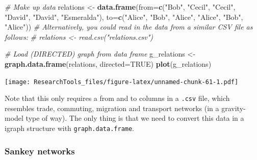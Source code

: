 \documentclass[]{article}
\newenvironment{Shaded}{\begin{snugshade}}{\end{snugshade}}
\newcommand{\KeywordTok}[1]{\textcolor[rgb]{0.13,0.29,0.53}{\textbf{{#1}}}}
\newcommand{\DataTypeTok}[1]{\textcolor[rgb]{0.13,0.29,0.53}{{#1}}}
\newcommand{\StringTok}[1]{\textcolor[rgb]{0.31,0.60,0.02}{{#1}}}
\newcommand{\CommentTok}[1]{\textcolor[rgb]{0.56,0.35,0.01}{\textit{{#1}}}}
\newcommand{\OtherTok}[1]{\textcolor[rgb]{0.56,0.35,0.01}{{#1}}}
\newcommand{\NormalTok}[1]{{#1}}
\theoremstyle{definition}
\theoremstyle{definition}
\theoremstyle{definition}
\theoremstyle{remark}
\begin{document}
\begin{Shaded}
\begin{Highlighting}[]
\CommentTok{# Make up data}
\NormalTok{relations <-}\StringTok{ }\KeywordTok{data.frame}\NormalTok{(}\DataTypeTok{from=}\KeywordTok{c}\NormalTok{(}\StringTok{"Bob"}\NormalTok{, }\StringTok{"Cecil"}\NormalTok{, }\StringTok{"Cecil"}\NormalTok{, }\StringTok{"David"}\NormalTok{, }\StringTok{"David"}\NormalTok{, }\StringTok{"Esmeralda"}\NormalTok{),}
                        \DataTypeTok{to=}\KeywordTok{c}\NormalTok{(}\StringTok{"Alice"}\NormalTok{, }\StringTok{"Bob"}\NormalTok{, }\StringTok{"Alice"}\NormalTok{, }\StringTok{"Alice"}\NormalTok{, }\StringTok{"Bob"}\NormalTok{, }\StringTok{"Alice"}\NormalTok{))}
\CommentTok{# Alternatively, you could read in the data from a similar CSV file as follows:}
\CommentTok{# relations <- read.csv("relations.csv")}

\CommentTok{# Load (DIRECTED) graph from data frame }
\NormalTok{g_relations <-}\StringTok{ }\KeywordTok{graph.data.frame}\NormalTok{(relations, }\DataTypeTok{directed=}\OtherTok{TRUE}\NormalTok{)}
\KeywordTok{plot}\NormalTok{(g_relations)}
\end{Highlighting}
\end{Shaded}

\texttt{[image: ResearchTools\_files/figure-latex/unnamed-chunk-61-1.pdf]}

Note that this only requires a from and to columns in a \texttt{.csv}
file, which resembles trade, commuting, migration and transport networks
(in a gravity-model type of way). The only thing is that we need to
convert this data in a igraph structure with \texttt{graph.data.frame}.

\subsubsection{Sankey networks}\label{sankey-networks}
\end{document}
